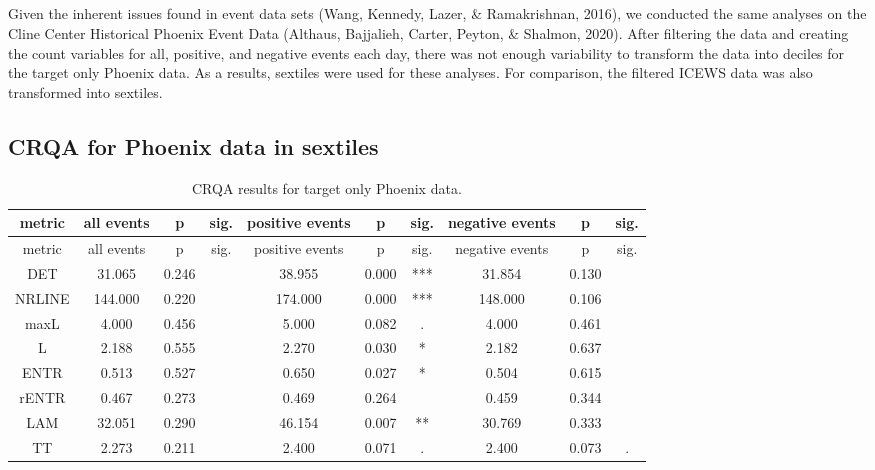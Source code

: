 \clearpage
\makeatletter
\efloat@restorefloats
\makeatother


\begin{appendix}
\section{}
Given the inherent issues found in event data sets (Wang, Kennedy,
Lazer, \& Ramakrishnan, 2016), we conducted the same analyses on the
Cline Center Historical Phoenix Event Data (Althaus, Bajjalieh, Carter,
Peyton, \& Shalmon, 2020). After filtering the data and creating the
count variables for all, positive, and negative events each day, there
was not enough variability to transform the data into deciles for the
target only Phoenix data. As a results, sextiles were used for these
analyses. For comparison, the filtered ICEWS data was also transformed
into sextiles.

\hypertarget{crqa-for-phoenix-data-in-sextiles}{%
\subsection{CRQA for Phoenix data in
sextiles}\label{crqa-for-phoenix-data-in-sextiles}}

\begin{longtable}[]{@{}cccccccccc@{}}
\caption{CRQA results for target only Phoenix data.}\tabularnewline
\toprule
metric & all events & p & sig. & positive events & p & sig. & negative
events & p & sig.\tabularnewline
\midrule
\endfirsthead
\toprule
metric & all events & p & sig. & positive events & p & sig. & negative
events & p & sig.\tabularnewline
\midrule
\endhead
DET & 31.065 & 0.246 & & 38.955 & 0.000 & *** & 31.854 & 0.130
&\tabularnewline
NRLINE & 144.000 & 0.220 & & 174.000 & 0.000 & *** & 148.000 & 0.106
&\tabularnewline
maxL & 4.000 & 0.456 & & 5.000 & 0.082 & . & 4.000 & 0.461
&\tabularnewline
L & 2.188 & 0.555 & & 2.270 & 0.030 & * & 2.182 & 0.637 &\tabularnewline
ENTR & 0.513 & 0.527 & & 0.650 & 0.027 & * & 0.504 & 0.615
&\tabularnewline
rENTR & 0.467 & 0.273 & & 0.469 & 0.264 & & 0.459 & 0.344
&\tabularnewline
LAM & 32.051 & 0.290 & & 46.154 & 0.007 & ** & 30.769 & 0.333
&\tabularnewline
TT & 2.273 & 0.211 & & 2.400 & 0.071 & . & 2.400 & 0.073 &
.\tabularnewline
\bottomrule
\end{longtable}


\end{appendix}
